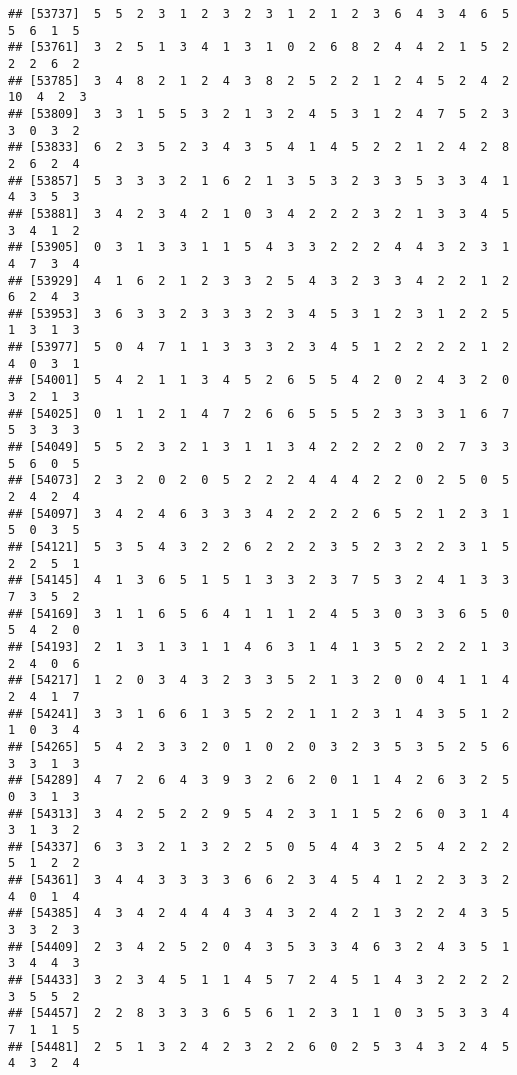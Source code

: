 \documentclass[
]{article}
\begin{document}
\begin{verbatim}
## [53737]  5  5  2  3  1  2  3  2  3  1  2  1  2  3  6  4  3  4  6  5  5  6  1  5
## [53761]  3  2  5  1  3  4  1  3  1  0  2  6  8  2  4  4  2  1  5  2  2  2  6  2
## [53785]  3  4  8  2  1  2  4  3  8  2  5  2  2  1  2  4  5  2  4  2 10  4  2  3
## [53809]  3  3  1  5  5  3  2  1  3  2  4  5  3  1  2  4  7  5  2  3  3  0  3  2
## [53833]  6  2  3  5  2  3  4  3  5  4  1  4  5  2  2  1  2  4  2  8  2  6  2  4
## [53857]  5  3  3  3  2  1  6  2  1  3  5  3  2  3  3  5  3  3  4  1  4  3  5  3
## [53881]  3  4  2  3  4  2  1  0  3  4  2  2  2  3  2  1  3  3  4  5  3  4  1  2
## [53905]  0  3  1  3  3  1  1  5  4  3  3  2  2  2  4  4  3  2  3  1  4  7  3  4
## [53929]  4  1  6  2  1  2  3  3  2  5  4  3  2  3  3  4  2  2  1  2  6  2  4  3
## [53953]  3  6  3  3  2  3  3  3  2  3  4  5  3  1  2  3  1  2  2  5  1  3  1  3
## [53977]  5  0  4  7  1  1  3  3  3  2  3  4  5  1  2  2  2  2  1  2  4  0  3  1
## [54001]  5  4  2  1  1  3  4  5  2  6  5  5  4  2  0  2  4  3  2  0  3  2  1  3
## [54025]  0  1  1  2  1  4  7  2  6  6  5  5  5  2  3  3  3  1  6  7  5  3  3  3
## [54049]  5  5  2  3  2  1  3  1  1  3  4  2  2  2  2  0  2  7  3  3  5  6  0  5
## [54073]  2  3  2  0  2  0  5  2  2  2  4  4  4  2  2  0  2  5  0  5  2  4  2  4
## [54097]  3  4  2  4  6  3  3  3  4  2  2  2  2  6  5  2  1  2  3  1  5  0  3  5
## [54121]  5  3  5  4  3  2  2  6  2  2  2  3  5  2  3  2  2  3  1  5  2  2  5  1
## [54145]  4  1  3  6  5  1  5  1  3  3  2  3  7  5  3  2  4  1  3  3  7  3  5  2
## [54169]  3  1  1  6  5  6  4  1  1  1  2  4  5  3  0  3  3  6  5  0  5  4  2  0
## [54193]  2  1  3  1  3  1  1  4  6  3  1  4  1  3  5  2  2  2  1  3  2  4  0  6
## [54217]  1  2  0  3  4  3  2  3  3  5  2  1  3  2  0  0  4  1  1  4  2  4  1  7
## [54241]  3  3  1  6  6  1  3  5  2  2  1  1  2  3  1  4  3  5  1  2  1  0  3  4
## [54265]  5  4  2  3  3  2  0  1  0  2  0  3  2  3  5  3  5  2  5  6  3  3  1  3
## [54289]  4  7  2  6  4  3  9  3  2  6  2  0  1  1  4  2  6  3  2  5  0  3  1  3
## [54313]  3  4  2  5  2  2  9  5  4  2  3  1  1  5  2  6  0  3  1  4  3  1  3  2
## [54337]  6  3  3  2  1  3  2  2  5  0  5  4  4  3  2  5  4  2  2  2  5  1  2  2
## [54361]  3  4  4  3  3  3  3  6  6  2  3  4  5  4  1  2  2  3  3  2  4  0  1  4
## [54385]  4  3  4  2  4  4  4  3  4  3  2  4  2  1  3  2  2  4  3  5  3  3  2  3
## [54409]  2  3  4  2  5  2  0  4  3  5  3  3  4  6  3  2  4  3  5  1  3  4  4  3
## [54433]  3  2  3  4  5  1  1  4  5  7  2  4  5  1  4  3  2  2  2  2  3  5  5  2
## [54457]  2  2  8  3  3  3  6  5  6  1  2  3  1  1  0  3  5  3  3  4  7  1  1  5
## [54481]  2  5  1  3  2  4  2  3  2  2  6  0  2  5  3  4  3  2  4  5  4  3  2  4

\end{verbatim}
\end{document}

